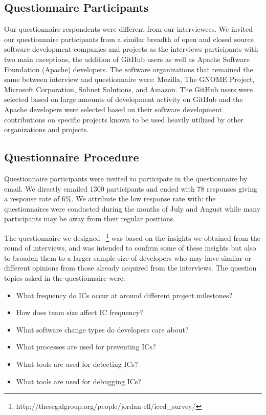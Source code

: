 \documentclass[conference]{IEEEtran}
\begin{document}
\subsection{Questionnaire Participants}

Our questionnaire respondents were different from our interviewees. We invited our questionnaire participants from a similar
breadth of open and closed source software development
companies and projects as the interviews participants with two main exceptions, the addition of GitHub users as well as Apache Software Foundation (Apache) developers.
The software organizations that remained the same between interview and questionnaire were: Mozilla, The GNOME Project, Microsoft Corporation,
Subnet Solutions, and Amazon. The GitHub
users were selected based on large amounts of development activity on GitHub and the Apache developers
were selected based on their software development contributions on specific projects known to be used heavily
utilized by other organizations and projects.

\subsection{Questionnaire Procedure}

Questionnaire participants were invited to participate in the questionnaire by email. We directly emailed 1300 participants and ended with 78 responses
giving a response rate of 6\%. We attribute the low response rate with: the questionnaires
were conducted during the months of July and August while many participants may be away from their regular positions.

The questionnaire we designed ~\footnote{http://thesegalgroup.org/people/jordan-ell/iced\_survey/}
was based on the insights we obtained from the round of interviews, and was intended to confirm some of these insights but also to broaden them to a larger sample size of developers who may have similar or different opinions from those already acquired from the interviews. The question topics asked in the questionnaire were:

\begin{itemize}
\item What frequency do ICs occur at around different project milestones?
\item How does team size affect IC frequency?
\item What software change types do developers care about?
\item What processes are used for preventing ICs?
\item What tools are used for detecting ICs?
\item What tools are used for debugging ICs?
\end{itemize}
\end{document}
